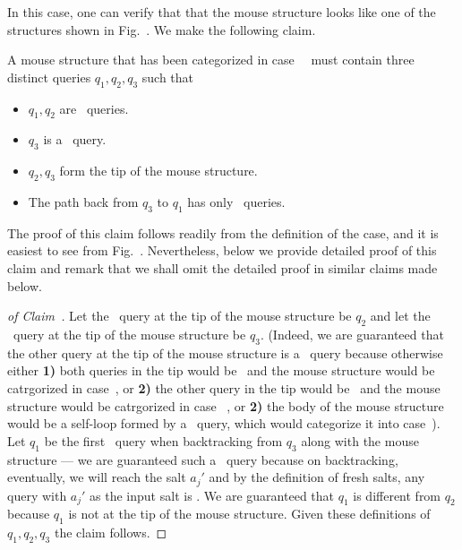 {
In this case, one can verify that that the mouse structure looks like one of the structures shown in Fig.~. We make the following claim. 
\begin{myclaim}\label{claim:casesixa}
  A mouse structure that has been categorized in case~~ must contain three distinct queries $q_1,q_2,q_3$  such that
\begin{itemize}
\item $q_1,q_2$ are \new\ queries.
\item $q_3$ is a \urep\ query. 
\item $q_2,q_3$ form the tip of the mouse structure.
\item The path back from $q_3$ to $q_1$ has only \urep\ queries.
\end{itemize}
\end{myclaim}
The proof of this claim follows readily from the definition of the case, and it is easiest to see from Fig.~. Nevertheless, below we provide detailed proof of this claim and remark that we shall omit the detailed proof in similar claims made below.
\begin{proof}[of Claim~]
Let the \new\ query at the tip of the mouse structure be $q_2$ and let the \urep\ query at the tip of the mouse structure be $q_3$. (Indeed, we are guaranteed that the other query at the tip of the mouse structure is a \urep\ query because otherwise either {\bf 1)}
both queries in the tip would be \new\ and the mouse structure would be catrgorized in case~, or {\bf 2)} the other query in the tip would be \frep\ and the mouse structure would be catrgorized in case~ , or {\bf 2)} the body of the mouse structure would be a self-loop formed by a \new\ query, which would categorize it into case~). Let $q_1$ be the first \new\ query when backtracking from $q_3$ along with the mouse structure — we are guaranteed such a \new\ query because on backtracking, eventually, we will reach the salt $a_j'$ and by the definition of fresh salts, any query with $a_j'$ as the input salt is \new. We are guaranteed that $q_1$ is different from $q_2$ because $q_1$ is not at the tip of the mouse structure.
Given these definitions of $q_1,q_2,q_3$ the claim follows.
\end{proof}

}
